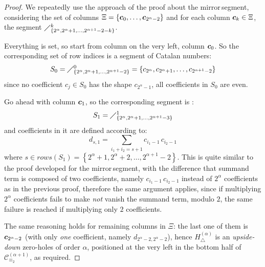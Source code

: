 \begin{proof}
We repeatedly use the approach
of the proof about the \flqq mirror\frqq\,segment, considering the set of columns 
$\Xi=\lbrace \boldsymbol{c}_{0},\ldots, \boldsymbol{c}_{2^{{\alpha}}-2}\rbrace$ and
for each column $\boldsymbol{c}_{k}\in\Xi$, the segment
    $\diagup_{\lbrace 2^{\alpha},2^{\alpha}+1,\ldots,2^{\alpha+1}-2-k\rbrace}^{k}$.

Everything is set, so start from column on the very left, column $\boldsymbol{c}_{0}$.
So the corresponding set of row indices  is a segment of Catalan numbers:
\begin{displaymath}
    S_{0}=\diagup_{\lbrace 2^{\alpha},2^{\alpha}+1,\ldots,2^{\alpha+1}-2\rbrace}^{0}
        = \lbrace c_{2^{\alpha}},c_{2^{\alpha}+1},\ldots,c_{2^{\alpha+1}-2}\rbrace
\end{displaymath}
since no coefficient $c_{j}\in S_{0}$ has the shape $c_{2^{\alpha}-1}$, 
all coefficients in $S_{0}$ are even.

Go ahead with column $\boldsymbol{c}_{1}$, so the corresponding segment is :
\begin{displaymath}
    S_{1}=\diagup_{\lbrace 2^{\alpha},2^{\alpha}+1,\ldots,2^{\alpha+1}-3\rbrace}^{1}
\end{displaymath}
and coefficients in it are defined according to:
\begin{displaymath}
    d_{s, 1} = \sum_{i_{1}+i_{2}=s+1} {c_{i_{1}-1}\,c_{i_{2}-1}}
\end{displaymath}
where $s\in rows(S_{1})= \left\lbrace 2^{\alpha}+1,2^{\alpha}+2,\ldots,2^{\alpha+1}-2\right\rbrace$. 
This is quite similar to the proof developed for the \flqq mirror\frqq\,segment,
with the difference that summand term is composed of two coefficients, namely
$c_{i_{1}-1}\,c_{i_{2}-1}$ instead of $2^{{\alpha}}$ coefficients as in the previous proof, 
therefore the same argument applies,
since if multiplying $2^{{\alpha}}$ coefficients fails to make \emph{not} vanish
the summand term, modulo $2$, the same failure is reached if multiplying only $2$ coefficients.

The same reasoning holds for remaining columns in $\Xi$: the last one of them is 
$\boldsymbol{c}_{2^{\alpha}-2}$ (with only \emph{one} coefficient, namely $d_{2^{\alpha}-2,2^{\alpha}-2}$), 
hence $H_{\bigtriangleup}^{({\alpha})}$ is an \emph{upside-down} zero-holes of order $\alpha$,
positioned at the very left in the bottom half of $\mathcal{C}_{\equiv_{2}}^{(\alpha+1)}$, as required.

\end{proof}

